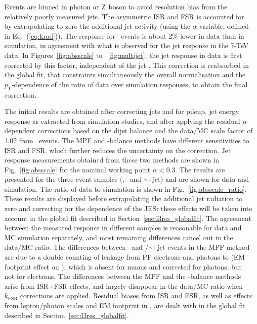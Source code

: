 \documentclass[11pt,twoside,a4paper,cmspaper,final,collab]{cms-tdr}
\begin{document}
Events are binned in photon or $\mathrm{Z}$ boson \pt to avoid resolution bias from the relatively poorly measured jets.
The asymmetric ISR and FSR is accounted for by extrapolating to zero the additional jet activity (using the $\alpha$ variable, defined in Eq.~(\ref{eq:krad})).
The response for \zmmjet\ events is about 2\% lower in data than in simulation, in agreement with what is observed for the jet response in the 7-TeV data.
 In Figures~\ref{fig:absscale} to ~\ref{fig:multijet}, the jet response in data is first corrected by this factor, independent of the jet \pt.
This correction is reabsorbed in the global fit, that constraints simultaneously the overall normalisation and the $p_\mathrm{T}$-dependence of the ratio of data over simulation responses, to obtain the final correction.

The initial results are obtained after correcting jets and \ptvecmiss for pileup, jet energy response as extracted from simulation studies, and after applying the residual $\eta$-dependent corrections based on the dijet balance and the data/MC scale factor of 1.02 from \zmmjet\ events.
The MPF and \pt-balance methods have different sensitivities to ISR and FSR, which further reduces the uncertainty on the correction.
Jet response measurements obtained from these two methods are shown in Fig.~\ref{fig:absscale} for the nominal working point $\alpha<0.3$. The results are presented for the three event samples (\zmmjet, \zeejet\ and $\gamma$+jet) and are shown for data and simulation. The ratio of data to simulation is shown in Fig.~\ref{fig:absscale_ratio}.
These results are displayed before extrapolating the additional jet radiation to zero and correcting for the \pt dependence of the JES: these effects will be taken into account in the global fit described in Section~\ref{sec:l3res_globalfit}.
The agreement between the measured response in different samples is reasonable for data and MC simulation separately, and most remaining differences cancel out in the data/MC ratio. The differences between \zeejet\ and \zmmjet/$\gamma$+jet events in the MPF method are due to a double counting of leakage from PF electrons and photons to \ptvecmiss (EM footprint effect on \ptvecmiss), which is absent for muons and corrected for photons, but not for electrons. The differences between the MPF and the \pt-balance methods arise from ISR+FSR effects, and largely disappear in the data/MC ratio when $k_\mathrm{FSR}$ corrections are applied.
Residual biases from ISR and FSR, as well as effects from lepton/photon scales and EM footprint in \ptvecmiss, are dealt with in the global fit described in Section~\ref{sec:l3res_globalfit}.
\end{document}
